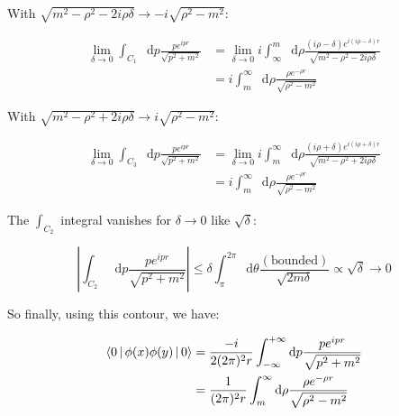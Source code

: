 \documentclass{beamer}
\newcommand{\integrand}{\frac{p e^{ipr}}{\sqrt{p^2 + m^2}}}
\newcommand{\diffop}{\mathop{}\!\mathrm{d}}
\newcommand{\dip}{\diffop p}
\newcommand{\drho}{\diffop \rho}
\newcommand{\dtheta}{\diffop \theta}
\newcommand{\phixy}{\Braket{0|\phi(x)\phi(y)|0}}
\newcommand{\intii}{\int_{-\infty}^{+\infty}}
\newcommand{\limdel}{\lim_{\delta \to 0}}
\newcommand{\integral}{\intii \dip \integrand}
\begin{document}
\begin{frame}

With $\sqrt{m^2 - \rho^2 - 2i\rho\delta} \to -i \sqrt{\rho^2 - m^2}$:

\begin{equation*}
\begin{split}
\limdel \int_{C_1} \dip \integrand &= \limdel i \int_\infty^m \drho \frac{(i\rho - \delta)e^{i(i\rho - \delta)r}}{\sqrt{m^2 - \rho^2 - 2i\rho\delta}} \\
&= i \int_m^\infty \drho \frac{\rho e^{-\rho r}}{\sqrt{\rho^2 - m^2}}
\end{split}
\end{equation*}

With $\sqrt{m^2 - \rho^2 + 2i\rho\delta} \to i \sqrt{\rho^2 - m^2}$:

\begin{equation*}
\begin{split}
\limdel \int_{C_3} \dip \integrand &= \limdel i \int_m^\infty \drho \frac{(i\rho + \delta)e^{i(i\rho + \delta)r}}{\sqrt{m^2 - \rho^2 + 2i\rho\delta}} \\
&= i \int_m^\infty \drho \frac{\rho e^{-\rho r}}{\sqrt{\rho^2 - m^2}}
\end{split}
\end{equation*}
\end{frame}


\begin{frame}
The $\int_{C_2}$ integral vanishes for $\delta \to 0$ like $\sqrt{\delta}$:

\begin{equation*}
\left| \int_{C_2} \dip \integrand \right| \leq \delta \int_\pi^{2\pi} \dtheta
\frac{(\mathrm{bounded})}{\sqrt{2m\delta}} \propto \sqrt{\delta} \to 0
\end{equation*}

So finally, using this contour, we have:

\begin{equation*}
\begin{split}
\phixy &= \frac{-i}{2(2\pi)^2r} \integral \\
       &= \frac{1}{(2\pi)^2 r} \int_m^\infty \drho \frac{\rho e^{-\rho r}}{\sqrt{\rho^2 - m^2}}
\end{split}
\end{equation*}
\end{frame}
\end{document}
